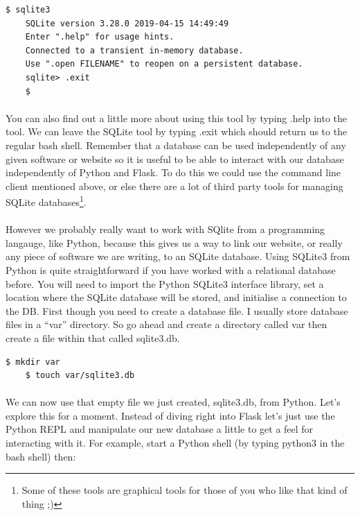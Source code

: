 \documentclass[12pt, a4paper, oneside]{book}
\begin{document}
{\begin{lstlisting}[style=DOS]
    $ sqlite3 
    SQLite version 3.28.0 2019-04-15 14:49:49
    Enter ".help" for usage hints.
    Connected to a transient in-memory database.
    Use ".open FILENAME" to reopen on a persistent database.
    sqlite> .exit
    $
\end{lstlisting}


\paragraph{} You can also find out a little more about using this tool by typing .help into the tool. We can leave the SQLite tool by typing .exit which should return us to the regular bash shell. Remember that a database can be used independently of any given software or website so it is useful to be able to interact with our database independently of Python and Flask. To do this we could use the command line client mentioned above, or else there are a lot of third party tools for managing SQLite databases\footnote{Some of these tools are graphical tools for those of you who like that kind of thing ;)}.


\paragraph{} However we probably really want to work with SQlite from a programming langauge, like Python, because this gives us a way to link our website, or really any piece of software we are writing, to an SQLite database. Using SQLite3 from Python is quite straightforward if you have worked with a relational database before. You will need to import the Python SQLite3 interface library, set a location where the SQLite database will be stored, and initialise a connection to the DB. First though you need to create a database file. I usually store database files in a ``var'' directory. So go ahead and create a directory called var then create a file within that called sqlite3.db.

\begin{lstlisting}[style=DOS]
    $ mkdir var
    $ touch var/sqlite3.db
\end{lstlisting}


\paragraph{} We can now use that empty file we just created, sqlite3.db, from Python. Let's explore this for a moment. Instead of diving right into Flask let's just use the Python REPL and manipulate our new database a little to get a feel for interacting with it.  For example, start a Python shell (by typing python3 in the bash shell) then:

}
\end{document}
